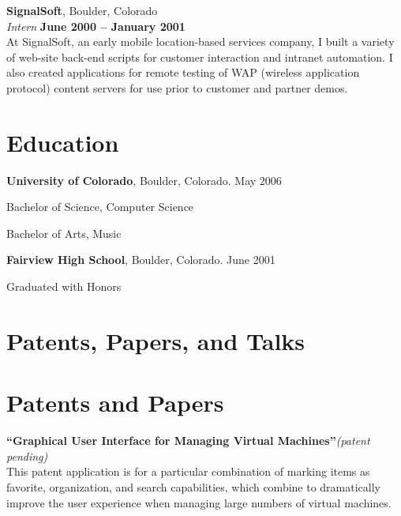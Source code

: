 \documentclass[margin,line]{resume}
\begin{document}
\begin{resume}
        {\bf SignalSoft}, Boulder, Colorado \vspace{2mm}\\\vspace{1mm}%
        {\sl Intern} \hfill {\bf June 2000 -- January 2001}\\
        At SignalSoft, an early mobile location-based services company, I built a
        variety of web-site back-end scripts for customer interaction and intranet
        automation. I also created applications for remote testing of WAP
        (wireless application protocol) content servers for use prior to customer
        and partner demos.
    \fi

    \section{\mysidestyle Education}

    {\bf University of Colorado}, Boulder, Colorado. May 2006 \vspace{2mm}%
    \begin{list1}
    \item[] Bachelor of Science, Computer Science
    \item[] Bachelor of Arts, Music
    \end{list1}
    \ifcv
        {\bf Fairview High School}, Boulder, Colorado. June 2001 \vspace{2mm}%
        \begin{list1}
        \item[] Graduated with Honors
        \end{list1}
    \fi

    \ifcv
        \section{\mysidestyle Patents, Papers, and Talks}
    \else
        \section{\mysidestyle Patents and Papers}
    \fi

    {\bf``Graphical User Interface for Managing Virtual Machines''}{\it (patent pending)} \vspace{2mm}\\
    This patent application is for a particular combination of marking
    items as favorite, organization, and search capabilities, which combine
    to dramatically improve the user experience when managing large numbers
    of virtual machines.


\end{resume}
\end{document}

